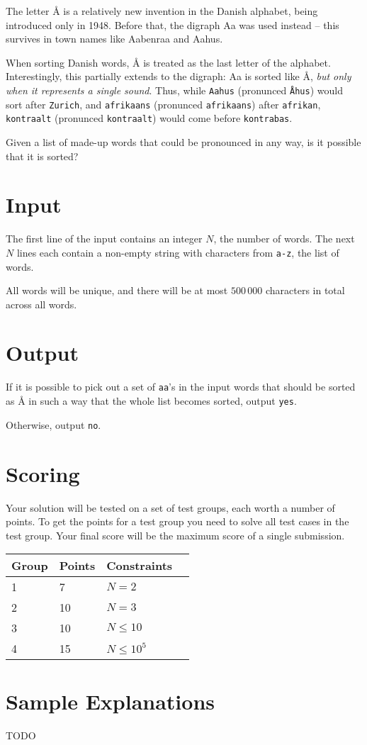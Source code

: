 The letter Å is a relatively new invention in the Danish alphabet, being introduced only in 1948.
Before that, the digraph Aa was used instead -- this survives in town names like Aabenraa and Aahus.

When sorting Danish words, Å is treated as the last letter of the alphabet.
Interestingly, this partially extends to the digraph: Aa is sorted like Å,
\emph{but only when it represents a single sound}.
Thus, while \texttt{Aahus} (pronunced \texttt{Åhus}) would sort after \texttt{Zurich},
and \texttt{afrikaans} (pronunced \texttt{afrikaans}) after \texttt{afrikan},
\texttt{kontraalt} (pronunced \texttt{kontraalt}) would come before \texttt{kontrabas}.

Given a list of made-up words that could be pronounced in any way, is it possible that it is sorted?

\section*{Input}
The first line of the input contains an integer $N$, the number of words.
The next $N$ lines each contain a non-empty string with characters from \texttt{a-z}, the list of words.

All words will be unique, and there will be at most $500\,000$ characters in total across all words.

\section*{Output}
If it is possible to pick out a set of \texttt{aa}'s in the input words that
should be sorted as Å in such a way that the whole list becomes sorted, output \texttt{yes}.

Otherwise, output \texttt{no}.

\section*{Scoring}
Your solution will be tested on a set of test groups, each worth a number of points.
To get the points for a test group you need to solve all test cases in the test group.
Your final score will be the maximum score of a single submission.

\noindent
\begin{tabular}{| l | l | l | l |}
\hline
Group & Points & Constraints \\ \hline
1     & 7      & $N = 2$ \\ \hline
2     & 10     & $N = 3$ \\ \hline
3     & 10     & $N \le 10$ \\ \hline
4     & 15     & $N \le 10^5$ \\ \hline
\end{tabular}

\section*{Sample Explanations}
TODO
